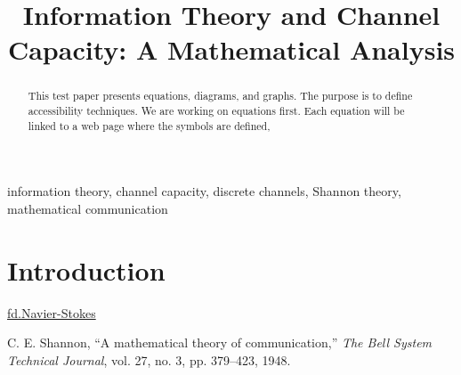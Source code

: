 \documentclass[conference]{IEEEtran}
\def\eqn#1{\href{https://eqndict/#1.md}{#1}}
\begin{document}
\title{Information Theory and Channel Capacity: A Mathematical Analysis}

\author{
}

\maketitle

\begin{abstract}
This test paper presents equations, diagrams, and graphs.
The purpose is to define accessibility techniques. We are working on equations first.
Each equation will be linked to a web page where the symbols are defined,


\end{abstract}

\begin{IEEEkeywords}
information theory, channel capacity, discrete channels, Shannon theory, mathematical communication
\end{IEEEkeywords}

\section{Introduction}
\eqn{fd.Navier-Stokes} %

\begin{thebibliography}{1}
C. E. Shannon, ``A mathematical theory of communication,'' \textit{The Bell System Technical Journal}, vol. 27, no. 3, pp. 379--423, 1948.
\end{thebibliography}
\end{document}
